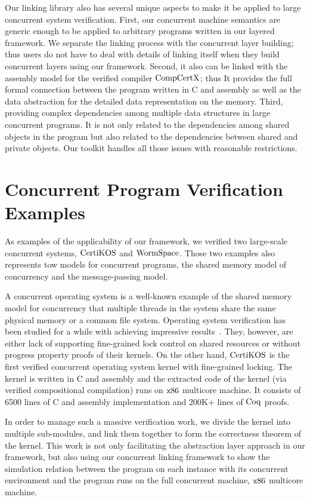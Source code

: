 Our linking library also has several unique aspects to make it be applied to large concurrent system verification.  
First, our concurrent machine semantics are generic enough to be applied to arbitrary programs written in our layered framework. 
We separate the linking process with the concurrent layer building;
thus users do not have to deal with details of linking itself when they build concurrent layers using our framework. 
Second, it also can be linked with the assembly model for the verified compiler $\mathrm{CompCertX}$; thus 
It provides the full formal connection between the program written in C and assembly as well as 
the data abstraction for the detailed data representation on the memory. 
Third, providing complex dependencies among multiple data structures in large concurrent programs. 
It is not only related to the dependencies among shared objects in the program but also related to the dependencies between shared and private objects. 
Our toolkit handles all those issues with reasonable restrictions. 

\section{Concurrent Program Verification Examples}
\label{chapter:introduction:sec:concurrent-program-verification-examples}


As examples of the applicability of our framework,
we verified two large-scale concurrent systems, $\mathrm{CertiKOS}$ and $\mathrm{WormSpace}$.
Those two examples also represents tow models for concurrent programs, 
the shared memory model of concurrency and the message-passing model.  

A concurrent operating system is a well-known example of the shared memory model for concurrency that multiple threads in the system share the same physical memory or a common file system. 
Operating system verification has been studied for a while 
with achieving impressive results~\cite{klein2009sel4, xu16, hawblitzel10}.
They, however,  are either lack of supporting fine-grained lock control on shared resources or without progress property proofs of their kernels.
On the other hand, $\mathrm{CertiKOS}$ is the first verified concurrent operating system kernel with fine-grained locking. 
The kernel is written in C and assembly and the extracted code of the kernel (via verified compositional compilation)
runs on  $\mathrm{x86}$ multicore machine. 
It consists of 6500 lines of C and
assembly implementation and 200K+ lines of $\mathrm{Coq}$ proofs.

In order to manage such a massive verification work, 
we  divide the kernel 
into multiple sub-modules, 
and link them together 
to form the correctness theorem of the kernel. 
This work is not only facilitating the abstraction layer approach 
in our framework, but also using our concurrent linking framework 
to show the simulation relation 
between the program on each instance with its concurrent environment 
and the program runs on the full concurrent machine, $\mathrm{x86}$ multicore machine. 

